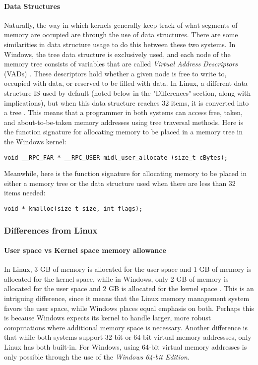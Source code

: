 \documentclass[letterpaper,10pt,titlepage]{article}
\begin{document}
\paragraph{Data Structures}
Naturally, the way in which kernels generally keep track of what segments of memory are occupied are through the use of data structures. There are some similarities in data structure usage to do this between these two systems. In Windows, the tree data structure is exclusively used, and each node of the memory tree consists of variables that are called \emph{Virtual Address Descriptors} (VADs) \cite{windows3}. These descriptors hold whether a given node is free to write to, occupied with data, or reserved to be filled with data. In Linux, a different data structure IS used by default (noted below in the "Differences" section, along with implications), but when this data structure reaches 32 items, it is converted into a tree \cite{linux2}. This means that a programmer in both systems can access free, taken, and about-to-be-taken memory addresses using tree traversal methods.
Here is the function signature for allocating memory to be placed in a memory tree in the Windows kernel: \cite{windows3}
\begin{lstlisting}
void __RPC_FAR * __RPC_USER midl_user_allocate (size_t cBytes);
\end{lstlisting}

Meanwhile, here is the function signature for allocating memory to be placed in either a memory tree or the data structure used when there are less than 32 items needed:
\begin{lstlisting}
void * kmalloc(size_t size, int flags);
\end{lstlisting}

% 
%
%
\subsubsection{Differences from Linux}
\paragraph{User space vs Kernel space memory allowance}
In Linux, 3 GB of memory is allocated for the user space and 1 GB of memory is allocated for the kernel space, while in Windows, only 2 GB of memory is allocated for the user space and 2 GB is allocated for the kernel space \cite{windows1} \cite{linux1}. This is an intriguing difference, since it means that the Linux memory management system favors the user space, while Windows places equal emphasis on both. Perhaps this is because Windows expects its kernel to handle larger, more robust computations where additional memory space is necessary. Another difference is that while both systems support 32-bit or 64-bit virtual memory addressses, only Linux has both built-in. For Windows, using 64-bit virtual memory addresses is only possible through the use of the \emph{Windows 64-bit Edition}.
\end{document}

